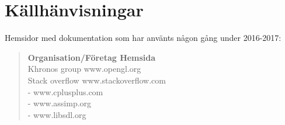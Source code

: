 \documentclass[12pt, a4paper]{article}
\begin{document}
	\newpage
	\section{Källhänvisningar}
	Hemsidor med dokumentation som har använts någon gång under 2016-2017: \\
	\begin{quote}
		\textbf{Organisation/Företag \hfill Hemsida} \\
		Khronos group \hfill www.opengl.org \\
		Stack overflow \hfill www.stackoverflow.com \\
		- \hfill www.cplusplus.com \\
		- \hfill www.assimp.org \\
		- \hfill www.libsdl.org \\
	\end{quote}
	
\end{document}
